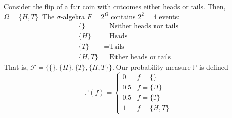   \begin{example}
    \label{ex:sigma-algebra-of-a-coin-flip}
    Consider the flip of a fair coin with outcomes either heads or tails. Then, $\Omega = \{H, T\}$. The $\sigma$-algebra $F = 2^{\Omega}$ contains $2^2 = 4$ events: 
    \begin{align*}
      \{\} &= \text{Neither heads nor tails} \\
      \{H\} &= \text{Heads} \\
      \{T\} &= \text{Tails} \\
      \{H, T\} &= \text{Either heads or tails}
    \end{align*}
    That is, $\mathcal{F} = \{\{\}, \{H\}, \{T\}, \{H, T\}\}$. Our probability measure $\mathbb{P}$ is defined
    \begin{equation}
      \mathbb{P}(f) = \begin{cases}
      0 & f = \{\} \\
      0.5 & f = \{H\} \\
      0.5 & f = \{T\} \\
      1 & f = \{H, T\}
      \end{cases}
    \end{equation}
  \end{example}

